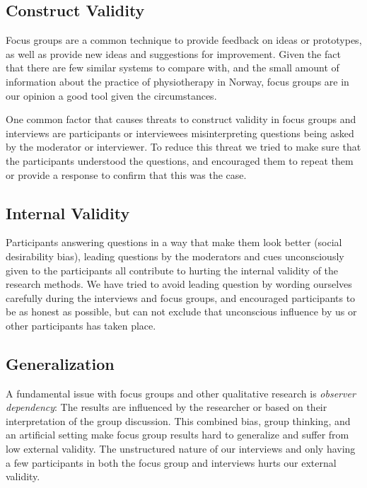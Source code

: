\subsection{Construct Validity}

Focus groups are a common technique to provide feedback on ideas or prototypes, as well as provide new ideas and suggestions for improvement. Given the fact that there are few similar systems to compare with, and the small amount of information about the practice of physiotherapy in Norway, focus groups are in our opinion a good tool given the circumstances.  

One common factor that causes threats to construct validity in focus groups and interviews are participants or interviewees misinterpreting questions being asked by the moderator or interviewer. To reduce this threat we tried to make sure that the participants understood the questions, and encouraged them to repeat them or provide a response to confirm that this was the case.

\subsection{Internal Validity}
Participants answering questions in a way that make them look better (social desirability bias), leading questions by the moderators and cues unconsciously given to the participants all contribute to hurting the internal validity of the research methods. We have tried to avoid leading question by wording ourselves carefully during the interviews and focus groups, and encouraged participants to be as honest as possible, but can not exclude that unconscious influence by us or other participants has taken place.

\subsection{Generalization}
A fundamental issue with focus groups and other qualitative research is \textit{observer dependency}: The results are influenced by the researcher or based on their interpretation of the group discussion. This combined bias, group thinking, and an artificial setting make focus group results hard to generalize and suffer from low external validity. The unstructured nature of our interviews and only having a few participants in both the focus group and interviews hurts our external validity.

